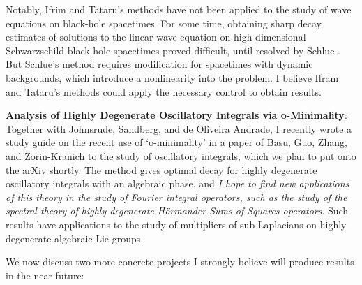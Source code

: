 \documentclass[11pt]{article}
\begin{document}
Notably, Ifrim and Tataru's methods have not been applied to the study of wave equations on black-hole spacetimes. For some time, obtaining sharp decay estimates of solutions to the linear wave-equation on high-dimensional Schwarzschild black hole spacetimes proved difficult, until resolved by Schlue \cite{Schlue}. But Schlue's method requires modification for spacetimes with dynamic backgrounds, which introduce a nonlinearity into the problem. I believe Ifram and Tataru's methods could apply the necessary control to obtain results.

{\bf Analysis of Highly Degenerate Oscillatory Integrals via o-Minimality}: Together with Johnsrude, Sandberg, and de Oliveira Andrade, I recently wrote a study guide on the recent use of `o-minimality' in a paper of Basu, Guo, Zhang, and Zorin-Kranich \cite{BasuGuoZhangZorinKranich} to the study of oscillatory integrals, which we plan to put onto the arXiv shortly. The method gives optimal decay for highly degenerate oscillatory integrals with an algebraic phase, and \emph{I hope to find new applications of this theory in the study of Fourier integral operators, such as the study of the spectral theory of highly degenerate H\"{o}rmander Sums of Squares operators}. Such results have applications to the study of multipliers of sub-Laplacians on highly degenerate algebraic Lie groups.

We now discuss two more concrete projects I strongly believe will produce results in the near future:

\end{document}
